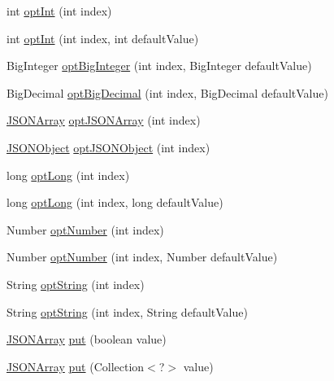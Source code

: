 \begin{DoxyCompactItemize}
\item 
int \hyperlink{classorg_1_1json_1_1JSONArray_a10c76bdd9ef243702d62c0c92ea803fc}{opt\-Int} (int index)
\item 
int \hyperlink{classorg_1_1json_1_1JSONArray_a820390cf8f7846a2363c59119e303a2d}{opt\-Int} (int index, int default\-Value)
\item 
Big\-Integer \hyperlink{classorg_1_1json_1_1JSONArray_a1a2020defcc86992a3cea8397d225f7b}{opt\-Big\-Integer} (int index, Big\-Integer default\-Value)
\item 
Big\-Decimal \hyperlink{classorg_1_1json_1_1JSONArray_a692453261daedf7500878198e0a1938c}{opt\-Big\-Decimal} (int index, Big\-Decimal default\-Value)
\item 
\hyperlink{classorg_1_1json_1_1JSONArray}{J\-S\-O\-N\-Array} \hyperlink{classorg_1_1json_1_1JSONArray_af73e0318cfde76d4ade3cfc1bb99e325}{opt\-J\-S\-O\-N\-Array} (int index)
\item 
\hyperlink{classorg_1_1json_1_1JSONObject}{J\-S\-O\-N\-Object} \hyperlink{classorg_1_1json_1_1JSONArray_a21bcc36e0e4ce0f4659497db27d7081d}{opt\-J\-S\-O\-N\-Object} (int index)
\item 
long \hyperlink{classorg_1_1json_1_1JSONArray_af38b848063c07f2a3218592bb595e722}{opt\-Long} (int index)
\item 
long \hyperlink{classorg_1_1json_1_1JSONArray_a2c6ccec4ce5ab42e192e5686bc0ac03b}{opt\-Long} (int index, long default\-Value)
\item 
Number \hyperlink{classorg_1_1json_1_1JSONArray_a0631e0440650687e8ac05c8433d0478f}{opt\-Number} (int index)
\item 
Number \hyperlink{classorg_1_1json_1_1JSONArray_a36bd582b05c3bf4a941d30a055331f0f}{opt\-Number} (int index, Number default\-Value)
\item 
String \hyperlink{classorg_1_1json_1_1JSONArray_aae00b0b37711915293a389a597f4adf7}{opt\-String} (int index)
\item 
String \hyperlink{classorg_1_1json_1_1JSONArray_a81407977272f634afe7d278ecb9c44b5}{opt\-String} (int index, String default\-Value)
\item 
\hyperlink{classorg_1_1json_1_1JSONArray}{J\-S\-O\-N\-Array} \hyperlink{classorg_1_1json_1_1JSONArray_a54cc64e03735749abb69a05cf5b3ed68}{put} (boolean value)
\item 
\hyperlink{classorg_1_1json_1_1JSONArray}{J\-S\-O\-N\-Array} \hyperlink{classorg_1_1json_1_1JSONArray_a4425988cb87aff93f6b7178392027d48}{put} (Collection$<$?$>$ value)
\item 

\end{DoxyCompactItemize}
